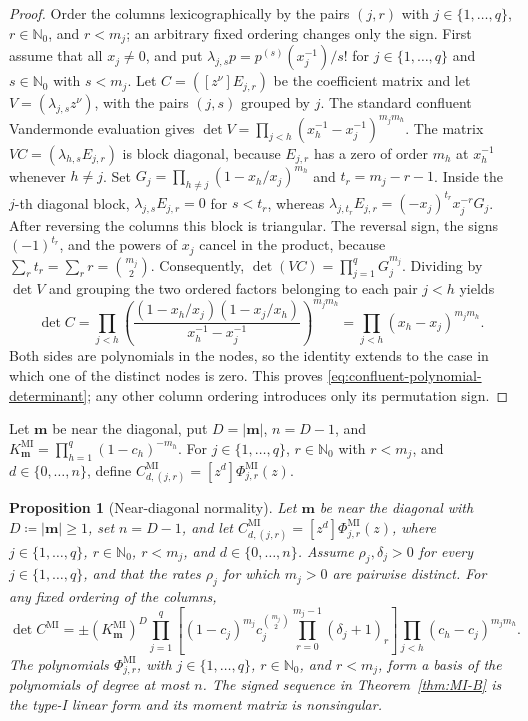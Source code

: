 \documentclass[10pt]{amsart}
\newcommand{\Nzero}{\mathbb N_0}
\newcommand{\mm}{\boldsymbol m}
\newcommand{\abs}[1]{\lvert#1\rvert}
\theoremstyle{plain}
\newtheorem{proposition}[theorem]{Proposition}
\theoremstyle{definition}
\theoremstyle{remark}
\begin{document}
\begin{proof}
Order the columns lexicographically by the pairs \((j,r)\) with
\(j\in\{1,\ldots,q\}\), \(r\in\Nzero\), and \(r<m_j\); an arbitrary fixed
ordering changes only the sign. First assume that all \(x_j\ne0\), and put
\(\lambda_{j,s}p=p^{(s)}(x_j^{-1})/s!\) for
\(j\in\{1,\ldots,q\}\) and \(s\in\Nzero\) with \(s<m_j\).
Let \(C=([z^\nu]E_{j,r})\) be the coefficient matrix and let
\(V=(\lambda_{j,s}z^\nu)\), with the pairs \((j,s)\) grouped by \(j\).
The standard confluent Vandermonde evaluation gives
\(\det V=\prod_{j<h}(x_h^{-1}-x_j^{-1})^{m_jm_h}\).
The matrix \(VC=(\lambda_{h,s}E_{j,r})\) is block diagonal, because
\(E_{j,r}\) has a zero of order \(m_h\) at \(x_h^{-1}\) whenever
\(h\ne j\). Set \(G_j=\prod_{h\ne j}(1-x_h/x_j)^{m_h}\) and
\(t_r=m_j-r-1\).
Inside the \(j\)-th diagonal block,
\(\lambda_{j,s}E_{j,r}=0\) for \(s<t_r\), whereas
\(\lambda_{j,t_r}E_{j,r}=(-x_j)^{t_r}x_j^{-r}G_j\).
After reversing the columns this block is triangular. The reversal sign,
the signs \((-1)^{t_r}\), and the powers of \(x_j\) cancel in the
product, because
\(\sum_rt_r=\sum_rr=\binom{m_j}{2}\). Consequently,
\(\det(VC)=\prod_{j=1}^qG_j^{m_j}\).
Dividing by \(\det V\) and grouping the two ordered factors belonging to
each pair \(j<h\) yields
\[
 \det C
 =\prod_{j<h}
 \left(\frac{(1-x_h/x_j)(1-x_j/x_h)}
 {x_h^{-1}-x_j^{-1}}\right)^{m_jm_h}
 =\prod_{j<h}(x_h-x_j)^{m_jm_h}.
\]
Both sides are polynomials in the nodes, so the identity extends to the
case in which one of the distinct nodes is zero. This proves
\eqref{eq:confluent-polynomial-determinant}; any other column ordering
introduces only its permutation sign.
\end{proof}

Let \(\mm\) be near the diagonal, put \(D=\abs\mm\), \(n=D-1\), and
\(K_{\mm}^{\mathrm{MI}}=\prod_{h=1}^q(1-c_h)^{-m_h}\).
For \(j\in\{1,\ldots,q\}\), \(r\in\Nzero\) with \(r<m_j\), and
\(d\in\{0,\ldots,n\}\), define
\(C^{\mathrm{MI}}_{d,(j,r)}=[z^d]\Phi_{j,r}^{\mathrm{MI}}(z)\).

\begin{proposition}[Near-diagonal normality]
\label{prop:MI-normality}
Let \(\mm\) be near the diagonal with \(D\coloneq\abs\mm\ge1\), set
\(n=D-1\), and let
\(C^{\mathrm{MI}}_{d,(j,r)}=[z^d]\Phi_{j,r}^{\mathrm{MI}}(z)\), where
\(j\in\{1,\ldots,q\}\), \(r\in\Nzero\), \(r<m_j\), and
\(d\in\{0,\ldots,n\}\). Assume \(\rho_j,\delta_j>0\) for every
\(j\in\{1,\ldots,q\}\), and that the rates \(\rho_j\) for which
\(m_j>0\) are pairwise
distinct. For any fixed ordering of the columns,
\begin{equation}
 \det C^{\mathrm{MI}}=
 \pm(K_{\mm}^{\mathrm{MI}})^D
 \prod_{j=1}^q\left[(1-c_j)^{m_j}
 c_j^{\binom{m_j}{2}}
 \prod_{r=0}^{m_j-1}(\delta_j+1)_r\right]
 \prod_{j<h}(c_h-c_j)^{m_jm_h}.
 \label{eq:MI-connection-determinant}
\end{equation}
The polynomials \(\Phi_{j,r}^{\mathrm{MI}}\), with
\(j\in\{1,\ldots,q\}\), \(r\in\Nzero\), and \(r<m_j\), form a basis
of the polynomials of degree at
most \(n\). The signed sequence in
Theorem~\ref{thm:MI-B} is the type-I linear form and its moment matrix is
nonsingular.
\end{proposition}
\end{document}
